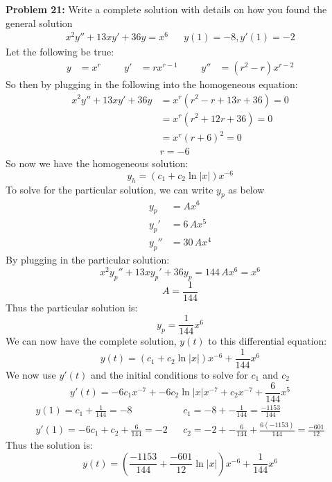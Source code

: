 \documentclass[12pt]{article}
\begin{document}
\noindent \textbf{Problem 21: }Write a complete solution with details on how you found the general solution
	\begin{align*}
	x^2y'' + 13xy' + 36y = x^6 && y(1) = -8, y'(1) = -2
	\end{align*}
Let the following be true:
	\begin{align*}
		y &= x^r &&&
		y' &= rx^{r-1} &&&
		y'' &= (r^2 - r)x^{r-2}
	\end{align*}
So then by plugging in the following into the homogeneous equation: 
	\begin{align*}
		x^2y'' + 13xy' + 36y &= x^r(r^2 - r + 13r + 36) = 0 \\
		&= x^r(r^2 + 12r + 36) = 0 \\
		&= x^r(r + 6)^2 = 0 \\
		& r = -6
	\end{align*}
So now we have the homogeneous solution: 
	$$
	y_h = (c_1 + c_2\ln|x|)x^{-6} 
	$$
To solve for the particular solution, we can write $y_p$ as below
	\begin{align*}
		y_p &= Ax^6 \\
		y_p' &= 6\,A{x}^{5} \\
		y_p'' &= 30\,A{x}^{4}
	\end{align*}
By plugging in the particular solution:
	$$
	x^2y_p'' + 13xy_p' + 36y_p = 144\,A{x}^{6} = x^6
	$$
	$$
	A = \frac{1}{144}
	$$
Thus the particular solution is: 
	$$
	y_p = \frac{1}{144}x^6
	$$
We can now have the complete solution, $y(t)$ to this differential equation:
	$$
	y(t) = (c_1 + c_2\ln|x|)x^{-6}  + \frac{1}{144}x^6
	$$
We now use $y'(t)$ and the initial conditions to solve for $c_1$ and $c_2$
	$$
	y'(t) = -6c_1x^{-7} + -6c_2\ln|x|x^{-7}  + c_2x^{-7} + \frac{6}{144}x^5
	$$
	\begin{align*}
		y(1) = c_1 + \frac{1}{144} = -8 && c_1 = -8 + -\frac{1}{144} = \frac{-1153}{144} \\
		y'(1) = -6c_1 + c_2 + \frac{6}{144} = -2 && c_2 = -2 + -\frac{6}{144} + \frac{6(-1153)}{144} = \frac{-601}{12}
	\end{align*}
Thus the solution is: 
	$$
	y(t) = \left(\frac{-1153}{144} + \frac{-601}{12}\ln|x|\right)x^{-6} + \frac{1}{144}x^6
	$$
	
\newpage 
\end{document}
